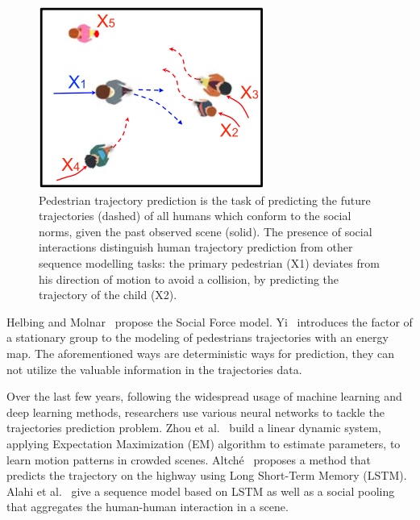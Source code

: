 \begin{figure}[h]
  \centering
  \includegraphics[width=\linewidth]{figures/fig-1.png}
  \caption{Pedestrian trajectory prediction is the task of predicting the future trajectories (dashed) of all humans which conform to the social norms, given the past observed scene (solid). The presence of social interactions distinguish human trajectory prediction from other sequence modelling tasks: the primary pedestrian (X1) deviates from his direction of motion to avoid a collision, by predicting the trajectory of the child (X2). \label{fig:fig-1}\protect\cite[]{HTF:DBLP:journals/corr/abs-2007-03639}}
\end{figure}


Helbing and Molnar~\cite{Helbing95} propose the Social Force model. Yi~\cite{Yi15} introduces the factor of a stationary group to the modeling of pedestrians trajectories with an energy map. The aforementioned ways are deterministic ways for prediction, they can not utilize the valuable information in the trajectories data.

Over the last few years, following the widespread usage of machine learning and deep learning methods, researchers use various neural networks to tackle the trajectories prediction problem. Zhou et al.~\cite{Zhou} build a linear dynamic system, applying Expectation Maximization (EM) algorithm to estimate parameters, to learn motion patterns in crowded scenes. Altché~\cite{Altche17} proposes a method that predicts the trajectory on the highway using Long Short-Term Memory (LSTM). Alahi et al.~\cite{Alahi16} give a sequence model based on LSTM as well as a social pooling that aggregates the human-human interaction in a scene.

